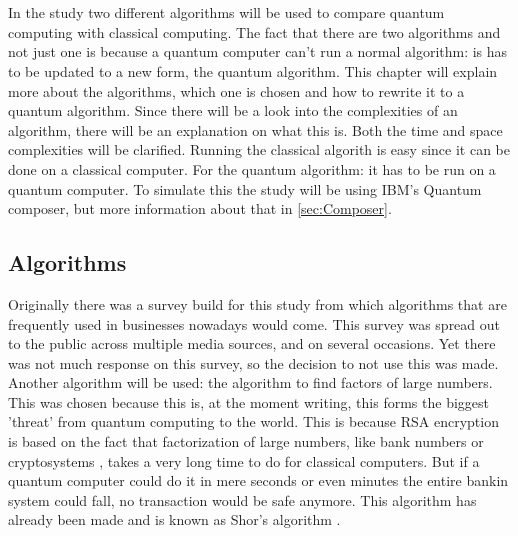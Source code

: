 
\chapter{}
\label{ch:methodologie}


In the study two different algorithms will be used to compare quantum computing with classical computing. 
The fact that there are two algorithms and not just one is because a quantum computer can't run a normal algorithm: is has to be updated to a new form, the quantum algorithm.
This chapter will explain more about the algorithms, which one is chosen and how to rewrite it to a quantum algorithm. Since there will be a look into the complexities of an algorithm, there will be an explanation on what this is.
Both the time and space complexities will be clarified. Running the classical algorith is easy since it can be done on a classical computer. For the quantum algorithm: it has to be run on a quantum computer.
To simulate this the study will be using IBM's Quantum composer, but more information about that in \ref{sec:Composer}.
\section{Algorithms}
Originally there was a survey build for this study from which algorithms that are frequently used in businesses nowadays would come. This survey was spread out to the public across multiple media sources, and on several occasions.
Yet there was not much response on this survey, so the decision to not use this was made. Another algorithm will be used: the algorithm to find factors of large numbers. This was chosen because this is, at the moment writing, this forms the biggest 'threat' from quantum computing to the world.
This is because RSA encryption is based on the fact that factorization of large numbers, like bank numbers or cryptosystems \autocite{Shor}, takes a very long time to do for classical computers. But if a quantum computer could do it in mere seconds or even minutes the entire bankin system could fall, no transaction would be safe anymore.
This algorithm has already been made and is known as Shor's algorithm \autocite{Shor}.
